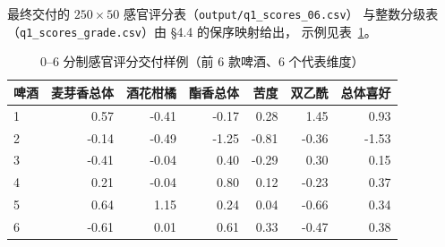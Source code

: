 最终交付的 $250\times50$ 感官评分表（\texttt{output/q1\_scores\_06.csv}）
与整数分级表（\texttt{q1\_scores\_grade.csv}）由 \S4.4 的保序映射给出，
示例见表~\ref{tab:q1sample}。

\begin{table}[H]
\centering
\caption{0--6 分制感官评分交付样例（前 6 款啤酒、6 个代表维度）}
\label{tab:q1sample}
\small
\begin{fittable}
\begin{tabular}{@{}lrrrrrr@{}}
\toprule
啤酒 & 麦芽香总体 & 酒花柑橘 & 酯香总体 & 苦度 & 双乙酰 & 总体喜好 \\
\midrule
1 & 0.57 & -0.41 & -0.17 & 0.28 & 1.45 & 0.93 \\
2 & -0.14 & -0.49 & -1.25 & -0.81 & -0.36 & -1.53 \\
3 & -0.41 & -0.04 & 0.40 & -0.29 & 0.30 & 0.15 \\
4 & 0.21 & -0.04 & 0.80 & 0.12 & -0.23 & 0.37 \\
5 & 0.64 & 1.15 & 0.24 & 0.04 & -0.66 & 0.34 \\
6 & -0.61 & 0.01 & 0.61 & 0.33 & -0.47 & 0.38 \\
\bottomrule
\end{tabular}
\end{fittable}
\end{table}
